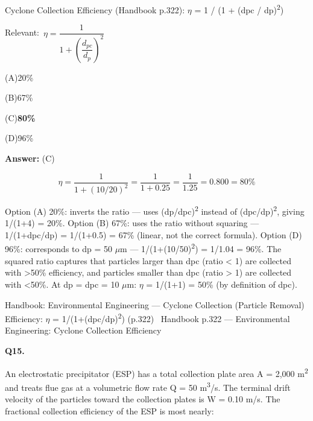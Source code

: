 \documentclass[11pt]{article}
\newcommand{\correct}[1]{\textbf{#1}\;{\color{accent}$\checkmark$}}
\newcommand{\optline}[2]{\par\noindent\hspace{1.2em}(#1)\hspace{0.6em}#2}
\begin{document}
Cyclone Collection Efficiency (Handbook p.322):
$\eta$ = 1 / (1 + (dpc / dp)\textsuperscript{2})\par\vspace{3pt}
{\small\color{soft}Relevant:}\ $\eta = \dfrac{1}{1 + \left(\dfrac{d_{pc}}{d_p}\right)^{2}}$\par\vspace{3pt}
\optline{A}{20\%}
\optline{B}{67\%}
\optline{C}{\correct{80\%}}
\optline{D}{96\%}
\par\vspace{3pt}
\vspace{2pt}\par\noindent\colorbox{boxbg}{\parbox{\dimexpr\linewidth-2\fboxsep\relax}{%
\vspace{2pt}\textbf{Answer:} (C)\par\vspace{2pt}
{\small \[\eta = \frac{1}{1+(10/20)^2} = \frac{1}{1+0.25} = \frac{1}{1.25} = 0.800 = 80\%\]

Option (A) 20\%: inverts the ratio --- uses (dp/dpc)\textsuperscript{2} instead of (dpc/dp)\textsuperscript{2}, giving 1/(1+4) = 20\%. Option (B) 67\%: uses the ratio without squaring --- 1/(1+dpc/dp) = 1/(1+0.5) = 67\% (linear, not the correct formula). Option (D) 96\%: corresponds to dp = 50 $\mu$m --- 1/(1+(10/50)\textsuperscript{2}) = 1/1.04 = 96\%. The squared ratio captures that particles larger than dpc (ratio < 1) are collected with >50\% efficiency, and particles smaller than dpc (ratio > 1) are collected with <50\%. At dp = dpc = 10 $\mu$m: $\eta$ = 1/(1+1) = 50\% (by definition of dpc).}\par\vspace{2pt}
{\footnotesize\color{soft}Handbook: Environmental Engineering --- Cyclone Collection (Particle Removal) Efficiency: $\eta$ = 1/(1+(dpc/dp)\textsuperscript{2}) (p.322) \textbullet\ Handbook p.322 --- Environmental Engineering: Cyclone Collection Efficiency}\vspace{2pt}
}}
\vspace{9pt}
\filbreak
\textbf{\color{accent}Q15.}\par\vspace{2pt}
An electrostatic precipitator (ESP) has a total collection plate area A = 2,000 m\textsuperscript{2} and treats flue gas at a volumetric flow rate Q = 50 m\textsuperscript{3}/s. The terminal drift velocity of the particles toward the collection plates is W = 0.10 m/s. The fractional collection efficiency of the ESP is most nearly:
\end{document}
